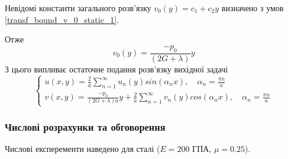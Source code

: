 Невідомі константи загального розв'язку $v_0(y) = c_1 + c_2 y$ визначено з умов \eqref{transf_bound_v_0_static_1}.

Отже 
\begin{equation}
    v_0(y) = \frac{-p_0}{(2G + \lambda)}y
\end{equation}
З цього випливає остаточне подання розв'язку вихідної задачі
\begin{equation}
    \begin{cases}
        u(x,y) = \frac{2}{a} \sum_{n=1}^{\infty} u_n(y) sin(\alpha_n x), \quad \alpha_n = \frac{\pi n}{a} \\
        v(x,y) = \frac{-p_0}{(2G + \lambda)a}y + \frac{2}{a} \sum_{n=1}^{\infty} v_n(y) cos(\alpha_n x), \quad \alpha_n = \frac{\pi n}{a}
    \end{cases}
\end{equation}

\subsubsection{Числові розрахунки та обговорення}
Числові експеременти наведено для сталі ($E=200$ ГПА, $\mu=0.25$).

